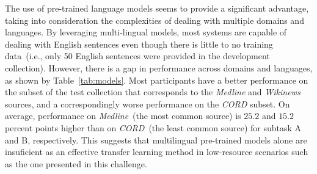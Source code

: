 \documentclass[a4paper,11pt,twocolumn,twoside]{article}
\begin{document}
The use of pre-trained language models seems to provide a significant advantage, taking into consideration the complexities of dealing with multiple domains and languages.
By leveraging multi-lingual models, most systems are capable of dealing with English sentences even though there is little to no training data~(i.e., only 50 English sentences were provided in the development collection).
However, there is a gap in performance across domains and languages, as shown by Table~\ref{tab:models}.
Most participants have a better performance on the subset of the test collection that corresponds to the \textit{Medline} and \textit{Wikinews} sources, and a correspondingly worse performance on the \textit{CORD} subset.
On average, performance on \textit{Medline}~(the most common source) is $25.2$ and $15.2$ percent points higher than on \textit{CORD}~(the least common source) for subtask A and B, respectively.
This suggests that multilingual pre-trained models alone are insuficient as an effective transfer learning method in low-resource scenarios such as the one presented in this challenge.
\end{document}
